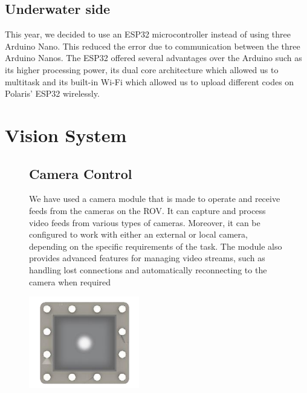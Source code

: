 \documentclass[a4paper,10pt]{article}
\begin{document}
	\subsection{Underwater side}
		This year, we decided to use an ESP32 microcontroller instead of using three Arduino Nano. 
		This reduced the error due to communication between the three Arduino Nanos. The ESP32 
		offered several advantages over the Arduino such as its higher processing power, its dual core 
		architecture which allowed us to multitask and its built-in Wi-Fi which allowed us to upload 
		different codes on Polaris’ ESP32 wirelessly.
	
	\section{Vision System}
	\begin{figure}[H]
		\begin{minipage}{0.7\textwidth}
			\subsection*{Camera Control}
			We have used a camera module that is made to operate and receive feeds 
			from the cameras on the ROV. It can capture and process video feeds from 
			various types of cameras. Moreover, it can be configured to work with either 
			an external or local camera, depending on the specific requirements of the 
			task. The module also provides advanced features for managing video 
			streams, such as handling lost connections and automatically 
			reconnecting to the camera when required
		\end{minipage}
		\hfill
		\begin{minipage}{0.2\textwidth}
			\centering
			\includegraphics[width=\textwidth]{main_camera}
		\end{minipage}
	\end{figure}
	
\end{document}
